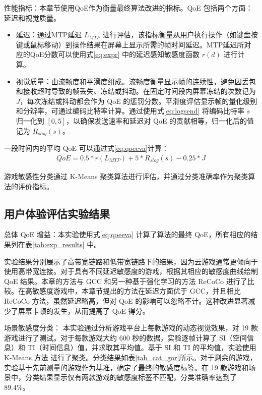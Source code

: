 性能指标：本章节使用QoE作为衡量最终算法改进的指标。QoE 包括两个方面：延迟和视觉质量。
\begin{itemize}
    \item 延迟：通过MTP延迟 $L_{MTP}$ \cite{alhilal2022nebula} 进行评估，该指标衡量从用户执行操作（如键盘按键或鼠标移动）到操作结果在屏幕上显示所需的帧时间延迟。MTP延迟所对应的QoE分数可以使用式\eqref{eq:expr} 中的延迟感知敏感度函数 $r(d)$ 进行计算。
    
    \item 视觉质量：由流畅度和平滑度组成。流畅度衡量显示帧的连续性，避免因丢包和接收超时导致的帧丢失、冻结或抖动。在固定时间段内屏幕冻结的次数记为 $J$，每次冻结或抖动都会作为 QoE 的惩罚分数。平滑度评估显示帧的量化级别和分辨率，可通过编码比特率计算。通过使用式\eqref{eq:logsend} 将编码比特率 $s$ 归一化到 $[0, 5]$，以确保发送速率和延迟对 QoE 的贡献相等，归一化后的值记为 $R_{slog}(s)$。
\end{itemize}


一段时间内的平均 QoE 可以通过式\eqref{eq:qoeeva}计算：
\begin{equation}
\begin{aligned}
    QoE = 0.5 * r(L_{MTP})  + 5 * R_{slog}(s) - 0.25 * J  
\end{aligned}
\label{eq:qoeeva}
\end{equation}

游戏敏感性分类通过 K-Means 聚类算法进行评估，并通过分类准确率作为聚类算法的评价指标。

\subsection{用户体验评估实验结果}
总体 QoE 增益：本实验使用式\eqref{eq:qoeeva} 计算了算法的最终 QoE，所有相应的结果列在表\ref{tab:exp_results} 中。



实验结果分别展示了高带宽链路和低带宽链路下的结果，因为云游戏通常更倾向于使用高带宽连接。对于具有不同延迟敏感度的游戏，根据其相应的敏感度曲线绘制 QoE 结果。本章的方法与 GCC 和另一种基于强化学习的方法 ReCoCo 进行了比较。在高敏感度游戏中，本章节提出的方法在延迟方面优于 GCC，并且相比 ReCoCo 方法，虽然延迟略高，但对 QoE 的影响可以忽略不计。这种改进显著减少了屏幕卡顿的发生，从而提高了 QoE 得分。



场景敏感度分类： 本实验通过分析游戏平台上每款游戏的动态视觉效果，对 19 款游戏进行了测试。对于每款游戏大约 600 秒的数据，实验逐帧计算了 SI（空间信息）和 TI（时间信息）值，并求取其平均值。基于 SI 和 TI 的平均值，实验使用 K-Means 方法 \cite{ahmed2020k} 进行了聚类。分类结果如表\ref{tab_cat_gor}所示。对于剩余的游戏，实验基于先前测量的游戏作为基准，确定了最终的敏感度标签。在 19 款游戏和场景中，分类结果显示仅有两款游戏的敏感度标签不匹配，分类准确率达到了 89.4\%。






